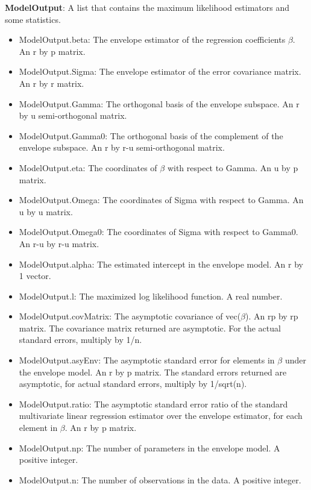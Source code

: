 \documentclass[a4paper,11pt,openany]{memoir}
\begin{document}
\begin{par}
\textbf{ModelOutput}: A list that contains the maximum likelihood estimators and some statistics.
\end{par} \vspace{1em}
\begin{itemize}
\setlength{\itemsep}{-1ex}
   \item ModelOutput.beta: The envelope estimator of the regression coefficients $\beta$. An r by p matrix.
   \item ModelOutput.Sigma: The envelope estimator of the error covariance matrix.  An r by r matrix.
   \item ModelOutput.Gamma: The orthogonal basis of the envelope subspace. An r by u semi-orthogonal matrix.
   \item ModelOutput.Gamma0: The orthogonal basis of the complement of the envelope subspace.  An r by r-u semi-orthogonal matrix.
   \item ModelOutput.eta: The coordinates of $\beta$ with respect to Gamma. An u by p matrix.
   \item ModelOutput.Omega: The coordinates of Sigma with respect to Gamma. An u by u matrix.
   \item ModelOutput.Omega0: The coordinates of Sigma with respect to Gamma0. An r-u by r-u matrix.
   \item ModelOutput.alpha: The estimated intercept in the envelope model.  An r by 1 vector.
   \item ModelOutput.l: The maximized log likelihood function.  A real number.
   \item ModelOutput.covMatrix: The asymptotic covariance of vec($\beta$).  An rp by rp matrix.  The covariance matrix returned are asymptotic.  For the actual standard errors, multiply by 1/n.
   \item ModelOutput.asyEnv: The asymptotic standard error for elements in $\beta$ under the envelope model.  An r by p matrix.  The standard errors returned are asymptotic, for actual standard errors, multiply by 1/sqrt(n).
   \item ModelOutput.ratio: The asymptotic standard error ratio of the standard multivariate linear regression estimator over the envelope estimator, for each element in $\beta$.  An r by p matrix.
   \item ModelOutput.np: The number of parameters in the envelope model.  A positive integer.
   \item ModelOutput.n: The number of observations in the data.  A positive integer.
\end{itemize}
\end{document}
